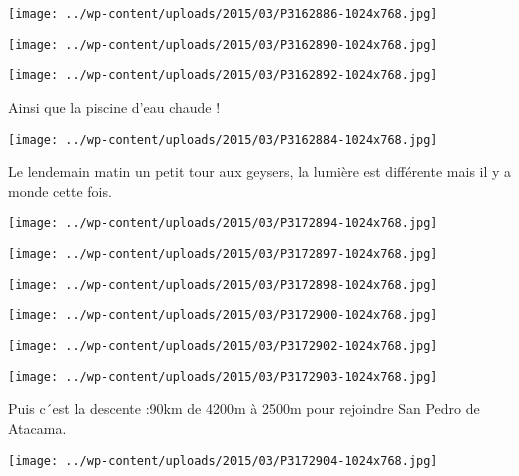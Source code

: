  \newline
\centerline{\texttt{[image: ../wp-content/uploads/2015/03/P3162886-1024x768.jpg]} } 
 \newline
 \newline
\centerline{\texttt{[image: ../wp-content/uploads/2015/03/P3162890-1024x768.jpg]} } 
 \newline
 \newline
\centerline{\texttt{[image: ../wp-content/uploads/2015/03/P3162892-1024x768.jpg]} } 
 \newline
 Ainsi que la piscine d'eau chaude ! \newline
 \newline
\centerline{\texttt{[image: ../wp-content/uploads/2015/03/P3162884-1024x768.jpg]} } 
 \newline
 Le lendemain matin un petit tour aux geysers, la lumière est différente mais il y a monde cette fois. \newline
 \newline
\centerline{\texttt{[image: ../wp-content/uploads/2015/03/P3172894-1024x768.jpg]} } 
 \newline
 \newline
\centerline{\texttt{[image: ../wp-content/uploads/2015/03/P3172897-1024x768.jpg]} } 
 \newline
 \newline
\centerline{\texttt{[image: ../wp-content/uploads/2015/03/P3172898-1024x768.jpg]} } 
 \newline
 \newline
\centerline{\texttt{[image: ../wp-content/uploads/2015/03/P3172900-1024x768.jpg]} } 
 \newline
 \newline
\centerline{\texttt{[image: ../wp-content/uploads/2015/03/P3172902-1024x768.jpg]} } 
 \newline
 \newline
\centerline{\texttt{[image: ../wp-content/uploads/2015/03/P3172903-1024x768.jpg]} } 
 \newline
 Puis c´est la descente :90km de 4200m à 2500m pour rejoindre San Pedro de Atacama. \newline
 \newline
\centerline{\texttt{[image: ../wp-content/uploads/2015/03/P3172904-1024x768.jpg]} } 
 \newline
 \newline
